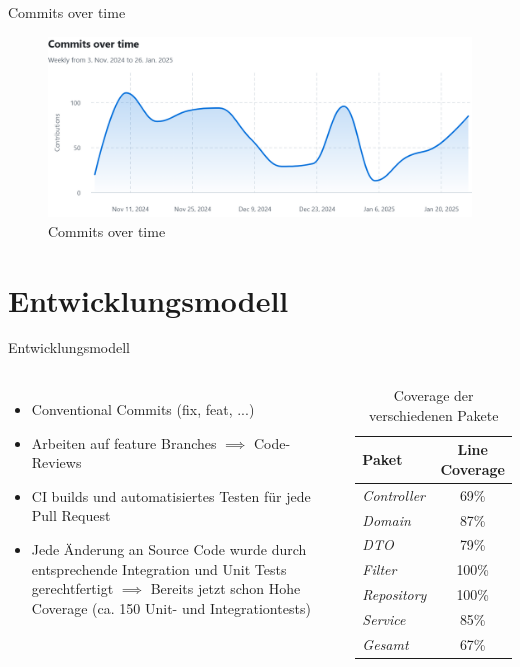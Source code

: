 \documentclass{sdqbeamer}
\begin{document}
\begin{frame}{Commits over time}
    \begin{figure}
        \centering
        \includegraphics[width=0.8\linewidth]{Commits over time.png}
        \caption{Commits over time}
        \label{fig:enter-label}
    \end{figure}
\end{frame}

\section{Entwicklungsmodell}

\begin{frame}{Entwicklungsmodell}
    \begin{columns}
        \begin{itemize}
        \item Conventional Commits (fix, feat, ...)
        \item Arbeiten auf feature Branches $\implies$ Code-Reviews
        \item CI builds und automatisiertes Testen für jede Pull Request 
        \item Jede Änderung an Source Code wurde durch entsprechende Integration und Unit Tests gerechtfertigt $\implies$ Bereits jetzt schon Hohe Coverage (ca. 150 Unit- und Integrationtests)
        
    \end{itemize}
        \begin{table}[h]
    \centering
    \renewcommand{\arraystretch}{1.3}
    \begin{tabular}{l|c}
        \textbf{Paket} & \textbf{Line Coverage} \\
        \hline
        \hline
        \textit{Controller}  & 69\% \\
        \textit{Domain}      & 87\% \\
        \textit{DTO}         & 79\% \\
        \textit{Filter}      & 100\% \\
        \textit{Repository}  & 100\% \\
        \textit{Service}     & 85\% \\
        \hline
        \textit{Gesamt}      & 67\% \\
    \end{tabular}
    \caption{Coverage der verschiedenen Pakete}
    \label{tab:progress}
\end{table}
    \end{columns}
    
\end{frame}
\end{document}
